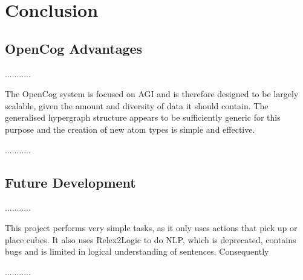 \chapter{Conclusion} \label{cha:conclusion}


\section{OpenCog Advantages}\label{sec:opencog_advantages}

...........

The OpenCog system is focused on AGI and is therefore designed to be largely scalable, given the amount and diversity of data it should contain. 
The generalised hypergraph structure appears to be sufficiently generic for this purpose and the creation of new atom types is simple and effective. 

...........

\section{Future Development}\label{sec:future_devel}

...........

This project performs very simple tasks, as it only uses actions that pick up or place cubes. 
It also uses Relex2Logic to do NLP, which is deprecated, contains bugs and is limited in logical understanding of sentences.
Consequently 

...........
